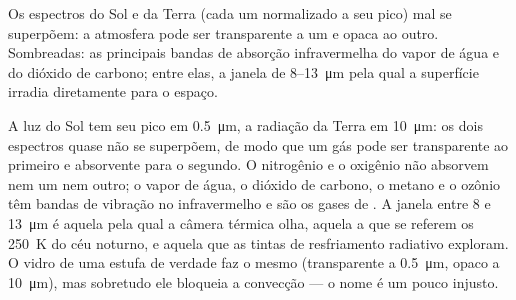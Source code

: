 \begin{omfigure}

{\small Os espectros do Sol e da Terra (cada um normalizado a seu
pico) mal se superpõem: a atmosfera pode ser transparente a um e
opaca ao outro. Sombreadas: as principais bandas de absorção infravermelha do
vapor de água e do dióxido de carbono; entre elas, a janela de \qty{8}{}--\qty{13}{\micro m}
pela qual a superfície irradia diretamente para o espaço.}
\end{omfigure}

\begin{remark}\label{rem:b2:thermal-radiation:selective}
A luz do Sol tem seu pico em \qty{0.5}{\micro m}, a radiação da Terra em
\qty{10}{\micro m}: os dois espectros quase não se superpõem, de modo que um gás pode ser
transparente ao primeiro e absorvente para o segundo. O nitrogênio e o
oxigênio não absorvem nem um nem outro; o vapor de água, o dióxido de carbono, o metano e o ozônio
têm bandas de vibração no infravermelho e são os gases de . A
janela entre \qty{8}{} e \qty{13}{\micro m} é aquela pela qual a câmera térmica
olha, aquela a que se referem os \qty{250}{K} do céu noturno, e aquela que
as tintas de resfriamento radiativo exploram. O vidro de uma estufa de verdade faz
o mesmo (transparente a \qty{0.5}{\micro m}, opaco a \qty{10}{\micro m}),
mas sobretudo ele bloqueia a convecção --- o nome é um pouco injusto.
\end{remark}

